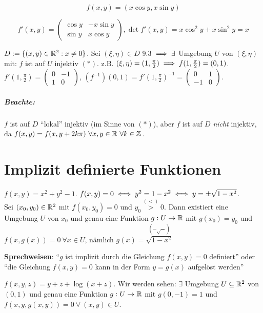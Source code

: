 \documentclass[a4paper,oneside,DIV15,BCOR12mm,chapterprefix=true,headings=onelinechapter]{scrbook}
\begin{document}
\begin{beispiel}

$$f(x,y) = (x \cos y, x \sin y)$$

$$f'(x,y) = \begin{pmatrix} \cos y & -x \sin y \\ \sin y & x \cos y \end{pmatrix}, \det f'(x,y) = x \cos^2 y + x \sin^2 y = x$$

$D:=\{(x,y) \in \mathbb{R}^2: x\ne 0\}$. Sei $(\xi, \eta)\in D$ 9.3 $\implies \exists$ Umgebung $U$ von $(\xi, \eta)$ mit: $f$ ist auf $U$ injektiv $(*)$. z.B. $(\xi, \eta) = (1, \frac{\pi}{2}) \implies f(1,\frac{\pi}2) = (0,1)$. $f'(1,\frac{\pi}2) = \begin{pmatrix}0 & -1 \\ 1 & 0 \end{pmatrix}$, $(f^{-1})(0,1) = f'(1,\frac{\pi}{2})^{-1} = \begin{pmatrix}0 & 1 \\ -1 & 0\end{pmatrix}$.

\end{beispiel}

\paragraph{Beachte:} $f$ ist auf $D$ "`lokal"'   injektiv (im Sinne von $(*)$), aber $f$ ist auf $D$ \emph{nicht} injektiv, da $f(x,y) = f(x,y+2 k\pi) \ \forall x,y\in\mathbb{R} \ \forall k\in\mathbb{Z}$.

\chapter{Implizit definierte Funktionen}
\def\grad{\mathop{\rm grad}\nolimits}
\def\MdU{\ensuremath{\mathbb{U}}}

\begin{beispiele}
\item $f(x,y)=x^2+y^2-1$. $f(x,y)=0\iff y^2=1-x^2\iff y=\pm\sqrt{1-x^2}$. \\
Sei $(x_0, y_0)\in\mathbb{R}^2$ mit $f(x_0, y_0)=0$ und $y_0\overset{(<)}{>}0$. Dann existiert eine Umgebung $U$ von $x_0$ und genau eine Funktion $g:U\to\mathbb{R}$ mit $g(x_0)=y_0$ und $f(x,g(x))=0\ \forall x \in U$, nämlich $g(x)=\overset{(-\sqrt{\cdots})}{\sqrt{1-x^2}}$

\textbf{Sprechweisen}: "`$g$ ist implizit durch die Gleichung $f(x,y)=0$ definiert"' oder "`die Gleichung $f(x,y)=0$ kann in der Form $y=g(x)$ aufgelöst werden"'

\item $f(x,y,z)=y+z+\log(x+z)$. Wir werden sehen: $\exists$ Umgebung $U\subseteq \mathbb{R}^2$ von $(0,1)$ und genau eine Funktion $g:U\to\mathbb{R}$ mit $g(0,-1)=1$ und $f(x,y,g(x,y))=0\ \forall\ (x,y)\in U$.
\end{beispiele}
\end{document}
